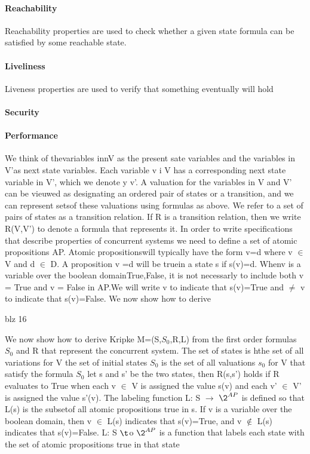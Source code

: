 \paragraph{Reachability}
Reachability properties are used to check whether
a given state formula can be satisfied by some
reachable state.

\paragraph{Liveliness}
Liveness properties are used to verify that
something eventually will hold
\paragraph{Security}

\paragraph{Performance}

 We think of thevariables innV as the present sate variables and the variables in V'as next state variables. Each variable v i V has a corresponding next state variable in V', which we denote y v'. A valuation for the variables in V and V' can be vieuwed as designating an ordered pair of states or a transition, and we can represent setsof these valuations using formulas as above. We refer to a set of pairs of states as a transition relation. If R is a transition relation, then we write R(V,V') to denote a formula that represents it.
 In order to write specifications that describe properties of concurrent systems we need to define a set of atomic propositions AP. Atomic propositionswill typically have the form v=d where v $\in$ V and d $\in$ D. A proposition v =d will be truein a state s if s(v)=d. Whenv is a variable over the  boolean domain{True,False}, it is not necessarly to include both v = True and  v = False in AP.We will write v to indicate that s(v)=True and $\neq$ v to indicate that s(v)=False.
 We now show how to derive
 
 blz 16
 
 We now show how to derive Kripke M=(S,$S_0$,R,L) from the first order formulas $S_0$ and R that represent the concurrent system.
 The set of states is hthe set of all variations	for V
 the set of initial states $S_0$ is the set of all valuations $s_0$ for V that satisfy the formula $S_0$
 let s and s' be the two states, then R(s,s') holds if R evaluates to True when each v $\in$ V is assigned the value s(v) and each v' $\in$  V' is assigned the value s'(v).
 The labeling function L: S $\to$  $\2^{AP}$ is defined so that L(s) is the subsetof all atomic propositions true in s. If v is a variable over the boolean domain, then v $\in$ L(s) indicates that s(v)=True, and v $\notin$  L(s) indicates that s(v)=False.
 L: S $\t$o  $\2^{AP}$  is a function that labels each state with the set of atomic propositions true in that state\\
 
